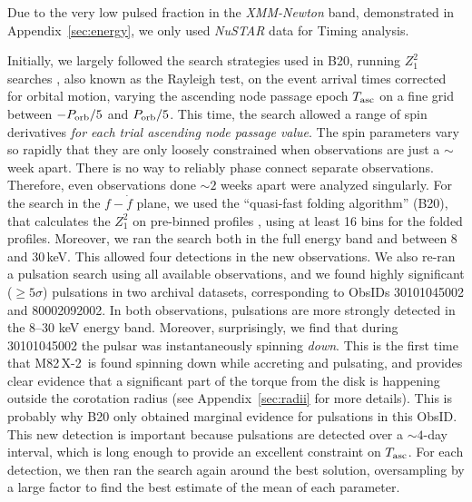 \documentclass[twocolumn]{aastex631}
\newcommand{\xmm}{{\it XMM-Newton}\xspace}
\newcommand{\nustar}{\textit{NuSTAR}\xspace}
\newcommand{\Mtwo}{M82\,X-2\xspace}
\newcommand{\Porb}{\ensuremath{P_{\rm orb}}}
\newcommand{\tasc}{\ensuremath{T_{\rm asc}{}}}
\begin{document}
Due to the very low pulsed fraction in the \xmm band, demonstrated in Appendix~\ref{sec:energy}, we only used \nustar data for Timing analysis.

Initially, we largely followed the search strategies used in B20, running $Z^2_1$ searches \citep{buccheriSearchPulsedGammaray1983}, also known as the Rayleigh test, on the event arrival times corrected for orbital motion, varying the ascending node passage epoch $\tasc$ on a fine grid between $-\Porb/5$ and $\Porb/5$.
This time, the search allowed a range of spin derivatives \textit{for each trial ascending node passage value}.
The spin parameters vary so rapidly that they are only loosely constrained when observations are just a $\sim$week apart. There is no way to reliably phase connect separate observations. Therefore, even observations done $ \sim2$ weeks apart were analyzed singularly.
For the search in the $f-\dot{f}$ plane, we used the ``quasi-fast folding algorithm'' (B20), that calculates the $Z^2_1$ on pre-binned profiles \citep{bachettiExtendingStatisticsGeneric2021}, using at least 16 bins for the folded profiles.
Moreover, we ran the search both in the full energy band and between 8 and 30\,keV.
This allowed four detections in the new observations.
We also re-ran a pulsation search using all available observations, and we found highly significant ($\geq5\sigma$) pulsations in two archival datasets, corresponding to ObsIDs 30101045002 and 80002092002.
In both observations, pulsations are more strongly detected in the 8--30 keV energy band.
Moreover, surprisingly, we find that during 30101045002 the pulsar was instantaneously spinning \textit{down}.
This is the first time that \Mtwo\ is found spinning down while accreting and pulsating, and provides clear evidence that a significant part of the torque from the disk is happening outside the corotation radius (see Appendix~\ref{sec:radii} for more details).
This is probably why B20 only obtained marginal evidence for pulsations in this ObsID.
This new detection is important because pulsations are detected over a $\sim4$-day interval, which is long enough to provide an excellent constraint on $\tasc$.
For each detection, we then ran the search again around the best solution, oversampling by a large factor to find the best estimate of the mean of each parameter.
\end{document}
